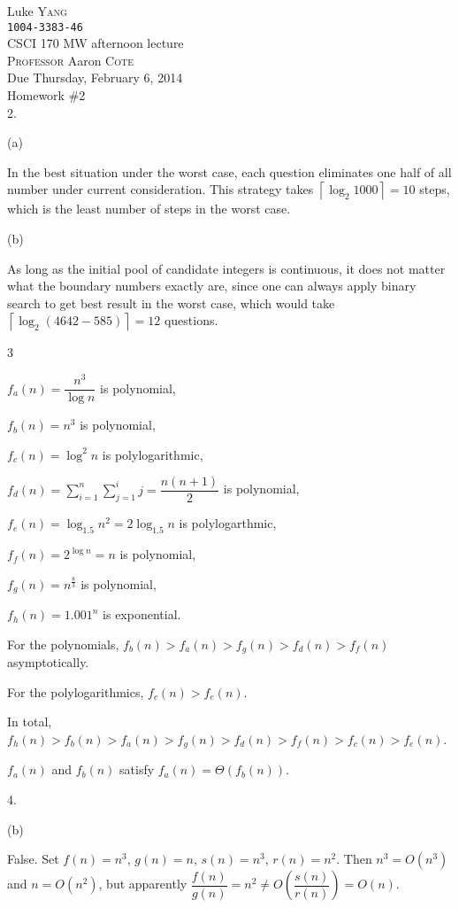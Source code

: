 \documentclass[UTF8,12pt,letterpaper,oneside]{amsart}
\begin{document}
\noindent Luke \textsc{Yang}\\
\texttt{1004-3383-46}\\
CSCI 170 MW afternoon lecture\\
\textsc{Professor} Aaron \textsc{Cote}\\
Due Thursday, February 6, 2014\\
Homework \#2\\

2. 

(a)

In the best situation under the worst case, each question eliminates one half of all number under current consideration. This strategy takes $\left \lceil \log_2 1000 \right \rceil = 10$ steps, which is the least number of steps in the worst case.

(b)

As long as the initial pool of candidate integers is continuous, it does not matter what the boundary numbers exactly are, since one can always apply binary search to get best result in the worst case, which would take $\left \lceil \log_2 (4642 - 585) \right \rceil = 12$ questions.

3

$f_a (n) = \dfrac{n^3}{\log n}$ is polynomial,

$f_b (n) = n^3$ is polynomial,

$f_c (n) = \log^2 n$ is polylogarithmic,

$f_d (n) = \sum_{i = 1}^n \sum_{j = 1}^i j = \dfrac{n(n + 1)}{2}$ is polynomial,

$f_e (n) = \log_{1.5} n^2 = 2 \log_{1.5} n$ is polylogarthmic,

$f_f (n) = 2^{\log n} = n$ is polynomial,

$f_g (n) = n^{\tfrac{8}{3}}$ is polynomial,

$f_h (n) = 1.001^n$ is exponential.

For the polynomials, $f_b (n) > f_a (n) > f_g (n) > f_d (n) > f_f (n)$ asymptotically.

For the polylogarithmics, $f_c (n) > f_e (n)$.

In total, $f_h (n) > f_b (n) > f_a (n) > f_g (n) > f_d (n) > f_f (n) > f_c (n) > f_e (n)$.

$f_a (n)$ and $f_b (n)$ satisfy $f_a (n) = \Theta (f_b(n))$.

4.

(b)

False. Set $f(n) = n^3$, $g(n) = n$, $s(n) = n^3$, $r(n) = n^2$. Then $n^3 = O (n^3)$ and $n = O(n^2)$, but apparently $\dfrac{f(n)}{g(n)} = n^2 \neq O\left(\dfrac{s(n)}{r(n)}\right) = O(n)$.
\end{document}
